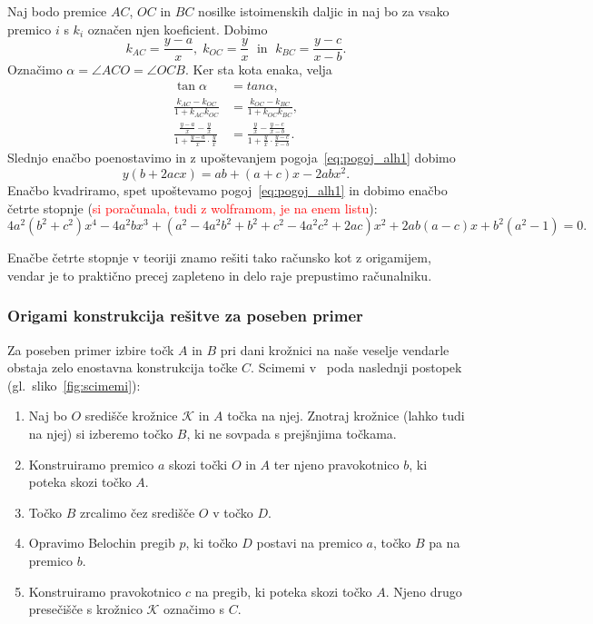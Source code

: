 Naj bodo premice $AC$, $OC$ in $BC$ nosilke istoimenskih daljic in naj bo za vsako premico $i$ s $k_i$ označen njen koeficient. Dobimo
$$ k_{AC} = \frac{y-a}{x}, \; k_{OC} = \frac{y}{x} \; \text{ in } \; k_{BC} = \frac{y-c}{x-b}.$$
Označimo $\alpha = \angle ACO = \angle OCB$. Ker sta kota enaka, velja
\begin{align*}
    \tan \alpha &= tan \alpha, \\
    \frac{k_{AC} - k_{OC}}{1 + k_{AC} k_{OC}} &= \frac{k_{OC} - k_{BC}}{1 + k_{OC} k_{BC}}, \\
    \frac{\frac{y-a}{x} - \frac{y}{x}}{1 + \frac{y-a}{x} \cdot \frac{y}{x}} &= \frac{\frac{y}{x} - \frac{y-c}{x-b}}{1 + \frac{y}{x} \cdot \frac{y-c}{x-b}}.
\end{align*}
Slednjo enačbo poenostavimo in z upoštevanjem pogoja~\ref{eq:pogoj_alh1} dobimo
$$ y(b + 2acx) = ab + (a+c)x - 2abx^2.$$
Enačbo kvadriramo, spet upoštevamo pogoj~\ref{eq:pogoj_alh1} in dobimo enačbo četrte stopnje (\textcolor{red}{si poračunala, tudi z wolframom, je na enem listu}):
$$ 4a^2(b^2 + c^2)x^4 - 4a^2bx^3 + (a^2 - 4a^2b^2 + b^2 + c^2 - 4a^2c^2 + 2ac)x^2 + 2ab(a-c)x + b^2(a^2-1) = 0.$$

Enačbe četrte stopnje v teoriji znamo rešiti tako računsko kot z origamijem, vendar je to praktično precej zapleteno in delo raje prepustimo računalniku.

\subsubsection*{Origami konstrukcija rešitve za poseben primer}

Za poseben primer izbire točk $A$ in $B$ pri dani krožnici na naše veselje vendarle obstaja zelo enostavna konstrukcija točke $C$. Scimemi v~\cite[str.\ 116-117]{scimemi2002} poda naslednji postopek (gl.\ sliko~\ref{fig:scimemi}):
\begin{enumerate}
    \item Naj bo $O$ središče krožnice $\mathcal{K}$ in $A$ točka na njej. Znotraj krožnice (lahko tudi na njej) si izberemo točko $B$, ki ne sovpada s prejšnjima točkama.
    \item Konstruiramo premico $a$ skozi točki $O$ in $A$ ter njeno pravokotnico $b$, ki poteka skozi točko $A$.
    \item Točko $B$ zrcalimo čez središče $O$ v točko $D$.
    \item Opravimo Belochin pregib $p$, ki točko $D$ postavi na premico $a$, točko $B$ pa na premico $b$.
    \item Konstruiramo pravokotnico $c$ na pregib, ki poteka skozi točko $A$. Njeno drugo presečišče s krožnico $\mathcal{K}$ označimo s $C$.
\end{enumerate}

